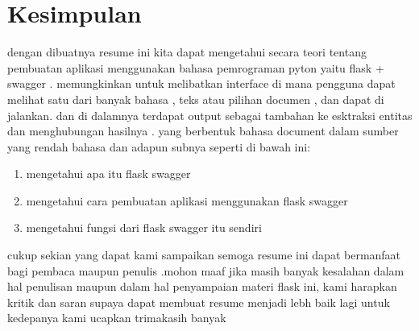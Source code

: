 \section{Kesimpulan}
dengan dibuatnya resume ini kita dapat mengetahui secara teori tentang pembuatan aplikasi menggunakan bahasa pemrograman pyton yaitu flask + swagger . 
memungkinkan untuk melibatkan interface di mana pengguna dapat melihat satu dari banyak bahasa , teks atau pilihan documen , dan dapat di jalankan. dan di dalamnya terdapat output sebagai tambahan ke esktraksi entitas dan menghubungan hasilnya . yang berbentuk bahasa document dalam sumber yang rendah bahasa dan adapun subnya seperti di bawah ini:

\begin{enumerate}
\item mengetahui apa itu flask swagger
\item mengetahui cara pembuatan aplikasi menggunakan flask swagger
\item mengetahui fungsi dari flask swagger itu sendiri
\end{enumerate}	
cukup sekian yang dapat kami sampaikan semoga resume ini dapat bermanfaat  bagi pembaca maupun penulis .mohon maaf jika masih banyak kesalahan dalam hal penulisan maupun dalam hal penyampaian materi flask ini, kami harapkan kritik dan saran supaya dapat membuat resume menjadi lebh baik lagi untuk kedepanya kami ucapkan trimakasih banyak

